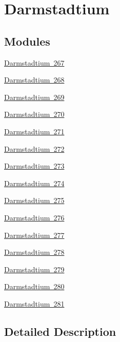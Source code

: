\hypertarget{group___isotope_const-_darmstadtium}{}\section{Darmstadtium}
\label{group___isotope_const-_darmstadtium}
\subsection*{Modules}
\begin{DoxyCompactItemize}
\item 
\mbox{\hyperlink{group___isotope_const-_darmstadtium-_ds267}{Darmstadtium 267}}
\item 
\mbox{\hyperlink{group___isotope_const-_darmstadtium-_ds268}{Darmstadtium 268}}
\item 
\mbox{\hyperlink{group___isotope_const-_darmstadtium-_ds269}{Darmstadtium 269}}
\item 
\mbox{\hyperlink{group___isotope_const-_darmstadtium-_ds270}{Darmstadtium 270}}
\item 
\mbox{\hyperlink{group___isotope_const-_darmstadtium-_ds271}{Darmstadtium 271}}
\item 
\mbox{\hyperlink{group___isotope_const-_darmstadtium-_ds272}{Darmstadtium 272}}
\item 
\mbox{\hyperlink{group___isotope_const-_darmstadtium-_ds273}{Darmstadtium 273}}
\item 
\mbox{\hyperlink{group___isotope_const-_darmstadtium-_ds274}{Darmstadtium 274}}
\item 
\mbox{\hyperlink{group___isotope_const-_darmstadtium-_ds275}{Darmstadtium 275}}
\item 
\mbox{\hyperlink{group___isotope_const-_darmstadtium-_ds276}{Darmstadtium 276}}
\item 
\mbox{\hyperlink{group___isotope_const-_darmstadtium-_ds277}{Darmstadtium 277}}
\item 
\mbox{\hyperlink{group___isotope_const-_darmstadtium-_ds278}{Darmstadtium 278}}
\item 
\mbox{\hyperlink{group___isotope_const-_darmstadtium-_ds279}{Darmstadtium 279}}
\item 
\mbox{\hyperlink{group___isotope_const-_darmstadtium-_ds280}{Darmstadtium 280}}
\item 
\mbox{\hyperlink{group___isotope_const-_darmstadtium-_ds281}{Darmstadtium 281}}
\end{DoxyCompactItemize}


\subsection{Detailed Description}
